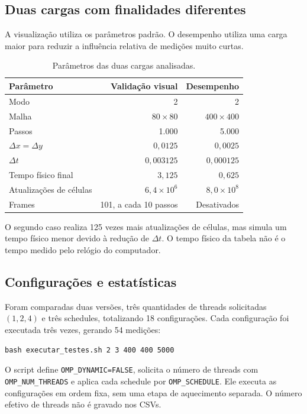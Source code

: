 \documentclass[12pt,a4paper]{article}
\begin{document}
\subsection{Duas cargas com finalidades diferentes}
A visualização utiliza os parâmetros padrão. O desempenho utiliza uma carga maior para reduzir a influência relativa de medições muito curtas.
\begin{table}[H]
\centering
\caption{Parâmetros das duas cargas analisadas.}
\label{tab:cargas}
\small
\renewcommand{\arraystretch}{1.15}
\begin{tabular}{lrr}
\toprule
Parâmetro & Validação visual & Desempenho\\
\midrule
Modo & 2 & 2\\
Malha & $80\times80$ & $400\times400$\\
Passos & 1.000 & 5.000\\
$\Delta x=\Delta y$ & $0{,}0125$ & $0{,}0025$\\
$\Delta t$ & $0{,}003125$ & $0{,}000125$\\
Tempo físico final & $3{,}125$ & $0{,}625$\\
Atualizações de células & $6{,}4\times10^6$ & $8{,}0\times10^8$\\
Frames & 101, a cada 10 passos & Desativados\\
\bottomrule
\end{tabular}
\end{table}
O segundo caso realiza 125 vezes mais atualizações de células, mas simula um tempo físico menor devido à redução de $\Delta t$. O tempo físico da tabela não é o tempo medido pelo relógio do computador.

\subsection{Configurações e estatísticas}
Foram comparadas duas versões, três quantidades de threads solicitadas $(1,2,4)$ e três schedules, totalizando 18 configurações. Cada configuração foi executada três vezes, gerando 54 medições:
\begin{lstlisting}[style=Terminal,caption={Comando que corresponde à configuração registrada nos resultados.}]
bash executar_testes.sh 2 3 400 400 5000
\end{lstlisting}
O script define \texttt{OMP\_DYNAMIC=FALSE}, solicita o número de threads com \texttt{OMP\_NUM\_THREADS} e aplica cada schedule por \texttt{OMP\_SCHEDULE}. Ele executa as configurações em ordem fixa, sem uma etapa de aquecimento separada. O número efetivo de threads não é gravado nos CSVs.
\end{document}
